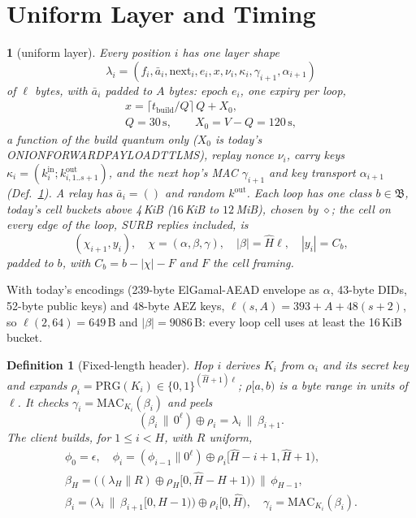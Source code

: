 \documentclass[journal]{IEEEtran}
\newtheorem{definition}{Definition}
\newcommand{\namedhead}{}
\newtheorem*{namedenv}{\namedhead}
\newenvironment{defD}[2]{\renewcommand{\namedhead}{Definition #1}%
  \begin{namedenv}[#2]}{\end{namedenv}}
\newcommand{\cl}{\diamond}
\newcommand{\nxt}{\mathrm{next}}
\newcommand{\Hm}{\hat H}
\newcommand{\PRG}{\mathrm{PRG}}
\newcommand{\MAC}{\mathrm{MAC}}
\DeclareRobustCommand{\code}[1]{{\ttfamily\renewcommand{\_}{\textunderscore\allowbreak}#1}}
\begin{document}
\section{Uniform Layer and Timing}\label{sec:layer}

\begin{defD}{D6}{uniform layer}
Every position $i$ has one layer shape
\[
\lambda_i=(f_i,\bar a_i,\nxt_i,e_i,x,\nu_i,\kappa_i,\gamma_{i+1},
\alpha_{i+1})
\]
of $\ell$ bytes, with $\bar a_i$ padded to $A$ bytes: epoch $e_i$, one
expiry per loop,
\begin{gather*}
x=\lceil t_{\mathrm{build}}/Q\rceil\,Q+X_0,\\
Q=30\,\mathrm{s},\qquad X_0=V-Q=120\,\mathrm{s},
\end{gather*}
a function of the build quantum only ($X_0$ is today's
\code{ONION\_FORWARD\_PAYLOAD\_TTL\_MS}), replay nonce
$\nu_i$, carry keys $\kappa_i=(k^{\mathrm{in}}_i;k^{\mathrm{out}}_{i,1..s+1})$,
and the next hop's MAC $\gamma_{i+1}$ and key transport $\alpha_{i+1}$
(Def.~\ref{def:header}).  A relay has $\bar a_i=()$ and random
$k^{\mathrm{out}}$.  Each loop has one class $b\in\mathfrak B$, today's
cell buckets above 4\,KiB ($16$\,KiB to $12$\,MiB), chosen by $\cl$; the
cell on every edge of the loop, SURB replies included, is
\[
(\chi_{i+1},y_i),\quad \chi=(\alpha,\beta,\gamma),\quad
|\beta|=\Hm\ell,\quad |y_i|=C_b ,
\]
padded to $b$, with $C_b=b-|\chi|-F$ and $F$ the cell framing.
\end{defD}

With today's encodings (239-byte ElGamal-AEAD envelope as $\alpha$, 43-byte
DIDs, 52-byte public keys) and $48$-byte AEZ keys,
$\ell(s,A)=393+A+48(s+2)$, so $\ell(2,64)=649$\,B and $|\beta|=9086$\,B:
every loop cell uses at least the 16\,KiB bucket.

\begin{definition}[Fixed-length header]\label{def:header}
Hop $i$ derives $K_i$ from $\alpha_i$ and its secret key and expands
$\rho_i=\PRG(K_i)\in\{0,1\}^{(\Hm+1)\ell}$; $\rho[a,b)$ is a byte range in
units of $\ell$.  It checks $\gamma_i=\MAC_{K_i}(\beta_i)$ and peels
\[
(\beta_i\,\|\,0^{\ell})\oplus\rho_i=\lambda_i\,\|\,\beta_{i+1}.
\]
The client builds, for $1\le i<H$, with $R$ uniform,
\begin{gather*}
\phi_0=\epsilon,\quad
\phi_i=(\phi_{i-1}\|0^{\ell})\oplus\rho_i[\Hm{-}i{+}1,\Hm{+}1),\\
\beta_H=\bigl((\lambda_H\|R)\oplus\rho_H[0,\Hm{-}H{+}1)\bigr)\,\|\,
\phi_{H-1},\\
\beta_i=\bigl(\lambda_i\,\|\,\beta_{i+1}[0,\Hm{-}1)\bigr)\oplus
\rho_i[0,\Hm),\quad \gamma_i=\MAC_{K_i}(\beta_i).
\end{gather*}
\end{definition}
\end{document}

